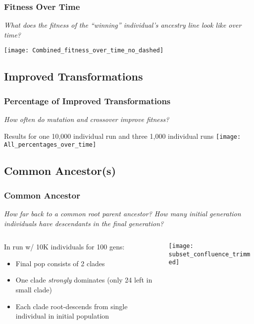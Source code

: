 \documentclass{beamer}
\begin{document}
\begin{frame}
\frametitle{Fitness Over Time}
\emph{What does the fitness of the ``winning'' individual's ancestry line look like over time?}
\begin{center}
\texttt{[image: Combined\_fitness\_over\_time\_no\_dashed]}
\end{center}
\end{frame}

\subsection[Improved Transformations]{Improved Transformations}

\begin{frame}
\frametitle{Percentage of Improved Transformations}
\emph{How often do mutation and crossover improve fitness?}
\begin{center}
{\tiny Results for one 10,000 individual run and three 1,000 individual runs}
\texttt{[image: All\_percentages\_over\_time]}
\end{center}
\end{frame}

\subsection{Common Ancestor(s)}

\begin{frame}
\frametitle{Common Ancestor}
\emph{How far back to a common root parent ancestor? How many initial generation individuals have descendants in the final generation?}
\begin{columns}
\begin{column}{0.55\textwidth}
In run w/ 10K individuals for 100 gens:
\begin{itemize}
	\item Final pop consists of 2 clades
	\item One clade \emph{strongly} dominates (only 24 left in small clade)
	\item Each clade root-descends from single individual in initial population
\end{itemize}
\end{column}
\begin{column}{0.45\textwidth}
\begin{center}
\texttt{[image: subset\_confluence\_trimmed]}
\end{center}
\end{column}
\end{columns}
\end{frame}
\end{document}
